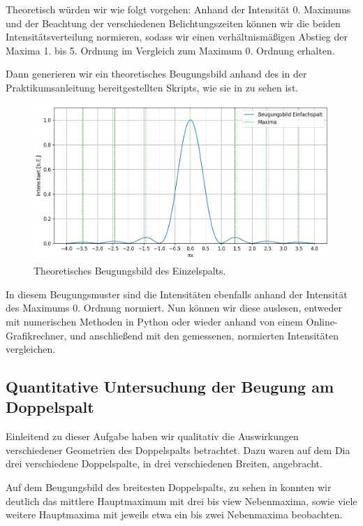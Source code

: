 Theoretisch würden wir wie folgt vorgehen: Anhand der Intensität 0. Maximums und der Beachtung der verschiedenen Belichtungszeiten können wir die beiden Intensitätsverteilung normieren, sodass wir einen verhältnismäßigen Abstieg der Maxima 1. bis 5. Ordnung im Vergleich zum Maximum 0. Ordnung erhalten.

Dann generieren wir ein theoretisches Beugungsbild anhand des in der Praktikumsanleitung bereitgestellten Skripts, wie sie in  zu sehen ist.

\begin{figure}[H]
  \centering
  \includegraphics[width=.9\textwidth]{files/plots/2/es_theorie_beugungsbild.png}
  \caption{Theoretisches Beugungsbild des Einzelspalts.}
  \label{fig:es_theorie_beugungsbild}
\end{figure}

In diesem Beugungsmuster sind die Intensitäten ebenfalls anhand der Intensität des Maximums 0. Ordnung normiert. Nun können wir diese auslesen, entweder mit numerischen Methoden in Python oder wieder anhand von einem Online-Grafikrechner, und anschließend mit den gemessenen, normierten Intensitäten vergleichen.

\subsection{Quantitative Untersuchung der Beugung am Doppelspalt}

Einleitend zu dieser Aufgabe haben wir qualitativ die Auswirkungen verschiedener Geometrien des Doppelspalts betrachtet. Dazu waren auf dem Dia drei verschiedene Doppelspalte, in drei verschiedenen Breiten, angebracht.

Auf dem Beugungsbild des breitesten Doppelspalts, zu sehen in  konnten wir deutlich das mittlere Hauptmaximum mit drei bis view Nebenmaxima, sowie viele weitere Hauptmaxima mit jeweils etwa ein bis zwei Nebenmaxima beobachten.

